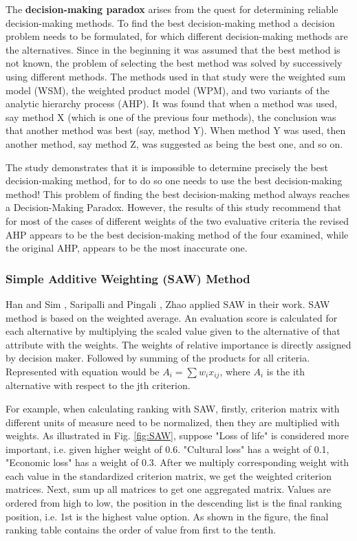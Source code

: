 The \textbf{decision-making paradox} arises from the quest for determining reliable decision-making methods.
To find the best decision-making method a decision problem needs to be formulated, for which different decision-making methods are the alternatives. 
Since in the beginning it was assumed that the best method is not known, the problem of selecting the best method was solved by successively using different methods. The methods used in that study \cite{DecisionMakingParadox} were the weighted sum model (WSM), the weighted product model (WPM), and two variants of the analytic hierarchy process (AHP). It was found that when a method was used, say method X (which is one of the previous four methods), the conclusion was that another method was best (say, method Y). When method Y was used, then another method, say method Z, was suggested as being the best one, and so on.

The study \cite{DecisionMakingParadox} demonstrates that it is impossible to determine precisely the best decision-making method, for to do so one needs to use the best decision-making method! This problem of finding the best decision-making method always reaches a Decision-Making Paradox. However, the results of this study recommend that for most of the cases of different weights of the two evaluative criteria the revised AHP appears to be the best decision-making method of the four examined, while the original AHP, appears to be the most inaccurate one.

\subsubsection{Simple Additive Weighting (SAW) Method}
Han and Sim \cite{HanAndSim2010}, Saripalli and Pingali \cite{MADMAC}, Zhao \cite{ZHAO2012962} applied SAW in their work.
SAW method is based on the weighted average. An evaluation score is calculated for each alternative by multiplying the scaled value given to the alternative of that attribute with the weights. The weights of relative importance is directly assigned by decision maker. Followed by summing of the products for all criteria. Represented with equation would be $A_{i}=\sum w_{i}x_{ij}$,
where $A_{i}$ is the ith alternative with respect to the jth criterion.

For example, when calculating ranking with SAW, firstly,
criterion matrix with different units of measure need to be normalized,
then they are multiplied with weights.
As illustrated in Fig. \ref{fig:SAW}, suppose "Loss of life" is considered more important, i.e. given higher weight of 0.6.
"Cultural loss" has a weight of 0.1, "Economic loss" has a weight of 0.3.
After we multiply corresponding weight with each value in the standardized criterion matrix, we get the weighted criterion matrices.
Next, sum up all matrices to get one aggregated matrix.
Values are ordered from high to low, the position in the descending list is the final
ranking position, i.e. 1st is the highest value option. As shown in the figure,
the final ranking table contains the order of value from first to the tenth.

